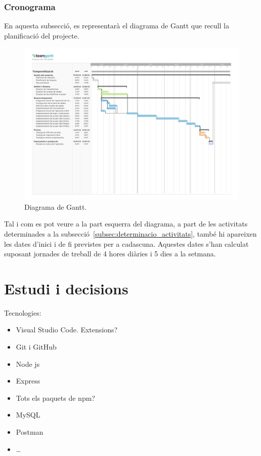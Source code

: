 \documentclass[a4paper,12pt]{ThesisStyle}
\begin{document}
\subsection{Cronograma}
\label{subsec:cronograma}

En aquesta subsecció, es representarà el diagrama de Gantt que recull la planificació del projecte.

\begin{figure}[H]
  \centering
  \includegraphics[width=1.3\textwidth, angle=90]{assets/planification_figs/ganttDiagram.pdf}
  \caption{\label{img:diagrama_gantt}Diagrama de Gantt.}
\end{figure}

Tal i com es pot veure a la part esquerra del diagrama, a part de les activitats determinades a la subsecció~\ref{subsec:determinacio_activitats}, també hi apareixen les dates d'inici i de fi previstes per a cadascuna. Aquestes dates s'han calculat suposant jornades de treball de 4 hores diàries i 5 dies a la setmana.


\chapter{Estudi i decisions}
\label{cap:estudi}

Tecnologies:
\begin{itemize}
  \item Visual Studio Code. Extensions?
  \item Git i GitHub
  \item Node js
  \item Express
  \item Tots els paquets de npm?
  \item MySQL
  \item Postman
  \item \ldots
\end{itemize}
\end{document}
